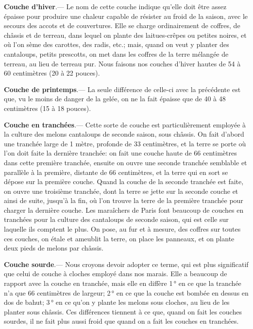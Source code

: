 \documentclass[10pt,a4paper]{book}
\begin{document}
\textbf{Couche d'hiver}.--- Le nom de cette couche indique qu'elle doit être assez épaisse pour produire une chaleur capable de résister au froid de la saison, avec le secours des accots et de couvertures. Elle se charge ordinairement de coffres, de châssis et de terreau, dans lequel on plante des laitues-crêpes ou petites noires, et où l'on sème des carottes, des radis, etc.; mais, quand on veut y planter des cantaloups, petits prescotts, on met dans les coffres de la terre mélangée de terreau, au lieu de terreau pur. Nous faisons nos couches d'hiver hautes de 54 à 60 centimètres (20 à 22 pouces).

\textbf{Couche de printemps}.--- La seule différence de celle-ci avec la précédente est que, vu le moins de danger de la gelée, on ne la fait épaisse que de 40 à 48 centimètres (15 à 18 pouces).

\textbf{Couche en tranchées}.--- Cette sorte de couche est particulièrement employée à la culture des melons cantaloups de seconde saison, sous châssis. On fait d'abord une tranchée large de 1 mètre, profonde de 33 centimètres, et la terre se porte où l'on doit faite la dernière tranchée: on fait une couche haute de 66 centimètres dans cette première tranchée, ensuite on ouvre une seconde tranchée semblable et parallèle à la première, distante de 66 centimètres, et la terre qui en sort se dépose sur la première couche. Quand la couche de la seconde tranchée est faite, on ouvre une troisième tranchée, dont la terre se jette sur la seconde couche et ainsi de suite, jusqu'à la fin, où l'on trouve la terre de la première tranchée pour charger la dernière couche. Les maraîchers de Paris font beaucoup de couches en tranchées pour la culture des cantaloups de seconde saison, qui est celle sur laquelle ils comptent le plus. On pose, au fur et à mesure, des coffres sur toutes ces couches, on étale et ameublit la terre, on place les panneaux, et on plante deux pieds de melons par châssis.

\textbf{Couche sourde}.--- Nous croyons devoir adopter ce terme, qui est plus significatif que celui de couche à cloches employé dans nos marais. Elle a beaucoup de rapport avec la couche en tranchée, mais elle en diffère 1\,° en ce que la tranchée n'a que 66 centimètres de largeur; 2\,° en ce que la couche est bombée en dessus en dos de bahut; 3\,° en ce qu'on y plante les melons sous cloches, au lieu de les planter sous châssis. Ces différences tiennent à ce que, quand on fait les couches sourdes, il ne fait plus aussi froid que quand on a fait les couches en tranchées.
\end{document}
